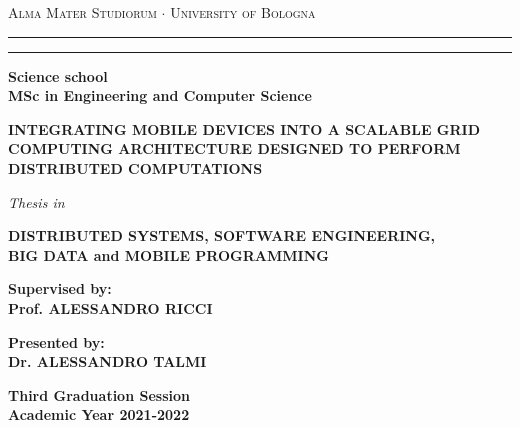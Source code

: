 \begin{titlepage}
    \begin{center}
    {{\Large{
        \textsc{Alma Mater Studiorum $\cdot$ University of Bologna}
    }}}
    \rule[0.1cm]{15.8cm}{0.1mm}
    \rule[0.5cm]{15.8cm}{0.6mm}
    {\small{\bf Science school\\ 
    MSc in Engineering and Computer Science }}
    \vspace{15mm}
    \end{center}
    \begin{center}
        \huge\bf INTEGRATING MOBILE DEVICES INTO A SCALABLE GRID COMPUTING ARCHITECTURE DESIGNED TO PERFORM DISTRIBUTED COMPUTATIONS
    \end{center}
    \vspace{15mm}
    \begin{center}
    {{\emph{Thesis in}}}
    
    \vspace{1mm}
    {{\bf{DISTRIBUTED SYSTEMS, SOFTWARE ENGINEERING,\\BIG DATA and MOBILE PROGRAMMING}}}
    \vspace{18mm}
    \end{center}
    \par
    \noindent
    \begin{minipage}[t]{0.47\textwidth}
    {\large{\bf Supervised by:\\
    Prof. ALESSANDRO RICCI}}
    \end{minipage}
    \hfill
    \begin{minipage}[t]{0.47\textwidth}\raggedleft
    {\large{\bf Presented by:\\
    Dr. ALESSANDRO TALMI}}
    \end{minipage}
    \vspace{20mm}
    \begin{center}
    {\large{\bf Third Graduation Session\\
    Academic Year 2021-2022}}
    \end{center}
\end{titlepage}
